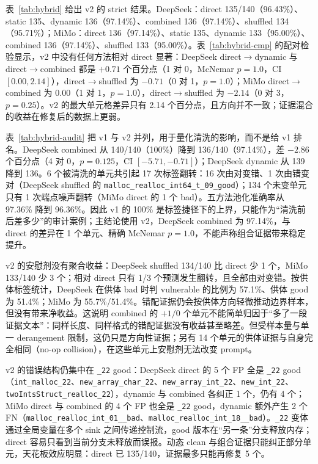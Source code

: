 \documentclass[conference]{IEEEtran}
\begin{document}
表~\ref{tab:hybrid} 给出 v2 的 strict 结果。DeepSeek：direct 135/140（96.43\%）、static 135、dynamic 136（97.14\%）、combined 136（97.14\%）、shuffled 134（95.71\%）；MiMo：direct 136（97.14\%）、static 135、dynamic 133（95.00\%）、combined 136（97.14\%）、shuffled 133（95.00\%）。表~\ref{tab:hybrid-cmp} 的配对检验显示，v2 中没有任何方法相对 direct 显著：DeepSeek direct$\to$dynamic 与 direct$\to$combined 都是 $+0.71$ 个百分点（1 对 0，McNemar $p=1.0$，CI $[0.00,2.14]$），direct$\to$shuffled 为 $-0.71$（0 对 1，$p=1.0$）；MiMo direct$\to$combined 为 $0.00$（1 对 1，$p=1.0$），direct$\to$shuffled 为 $-2.14$（0 对 3，$p=0.25$）。v2 的最大单元格差异只有 2.14 个百分点，且方向并不一致；证据混合的收益在修复后的数据上更弱。

表~\ref{tab:hybrid-audit} 把 v1 与 v2 并列，用于量化清洗的影响，而不是给 v1 排名。DeepSeek combined 从 140/140（100\%）降到 136/140（97.14\%），差 $-2.86$ 个百分点（4 对 0，$p=0.125$，CI $[-5.71,-0.71]$）；DeepSeek dynamic 从 139 降到 136。6 个被清洗的单元共引起 17 次标签翻转：16 次由对变错、1 次由错变对（DeepSeek shuffled 的 \texttt{malloc\_realloc\_int64\_t\_09\_good}）；134 个未变单元只有 1 次端点噪声翻转（MiMo direct 的 1 个 bad）。五方法池化准确率从 97.36\% 降到 96.36\%。因此 v1 的 100\% 是标签捷径下的上界，只能作为“清洗前后差多少”的审计案例；主结论使用 v2，DeepSeek combined 为 97.14\%，与 direct 的差异在 1 个单元、精确 McNemar $p=1.0$，不能声称组合证据带来稳定提升。

v2 的安慰剂没有聚合收益：DeepSeek shuffled 134/140 比 direct 少 1 个，MiMo 133/140 少 3 个；相对 direct 只有 1/3 个预测发生翻转，且全部由对变错。按供体标签统计，DeepSeek 在供体 bad 时判 vulnerable 的比例为 57.1\%、供体 good 为 51.4\%；MiMo 为 55.7\%/51.4\%。错配证据仍会按供体方向轻微推动边界样本，但没有带来净收益。这说明 combined 的 $+1/0$ 个单元不能简单归因于“多了一段证据文本”：同样长度、同样格式的错配证据没有收益甚至略差。但受样本量与单一 derangement 限制，这仍只是方向性证据；另有 14 个单元的供体证据与自身完全相同（no-op collision），在这些单元上安慰剂无法改变 prompt。

v2 的错误结构仍集中在 \texttt{\_22} good：DeepSeek direct 的 5 个 FP 全是 \texttt{\_22} good（\texttt{int\_malloc\_22}、\texttt{new\_array\_char\_22}、\texttt{new\_array\_int\_22}、\texttt{new\_int\_22}、\texttt{twoIntsStruct\_realloc\_22}），dynamic 与 combined 各纠正 1 个，仍有 4 个；MiMo direct 与 combined 的 4 个 FP 也全是 \texttt{\_22} good，dynamic 额外产生 2 个 FN（\texttt{malloc\_realloc\_int\_01\_\_bad}、\texttt{malloc\_realloc\_int\_18\_\_bad}）。\texttt{\_22} 变体通过全局变量在多个 sink 之间传递控制流，good 版本在“另一条”分支释放内存；direct 容易只看到当前分支未释放而误报。动态 clean 与组合证据只能纠正部分单元，天花板效应明显：direct 已 135/140，证据最多只能再修复 5 个。
\end{document}
